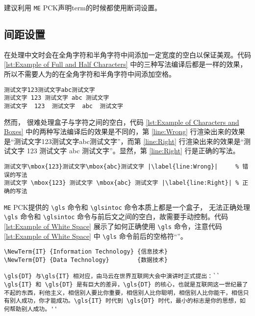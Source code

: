 \documentclass{article}
\begin{document}
建议利用 \texttt{\gls{ME}} \gls{PCK}声明\gls{term}的时候都使用断词设置。

\subsection{间距设置}
\XeLaTeX{} 在处理中文时会在全角字符和半角字符中间添加一定宽度的空白以保证美观。代码 \ref{lst:Example of Full and Half Characters} 中的三种写法编译后都是一样的效果，所以不需要人为的在全角字符和半角字符中间添加空格。

\begin{lstlisting}[style   = latexcode,
                   caption = {全角字符和半角字符混排},
                   label   = {lst:Example of Full and Half Characters}]
测试文字123测试文字abc测试文字
测试文字 123 测试文字 abc 测试文字
测试文字  123  测试文字  abc  测试文字
\end{lstlisting}

然而，\XeLaTeX{} 很难处理盒子与字符之间的空白，代码 \ref{lst:Example of Characters and Boxes} 中的两种写法编译后的效果是不同的，第 \ref{line:Wrong} 行渲染出来的效果是``测试文字\mbox{123}测试文字\mbox{abc}测试文字''，而第 \ref{line:Right} 行渲染出来的效果是``测试文字 \mbox{123} 测试文字 \mbox{abc} 测试文字''。显然，第 \ref{line:Right} 行是正确的写法。
\begin{lstlisting}[style      = latexcode,
                   caption    = {字符与盒子混排},
                   label      = {lst:Example of Characters and Boxes},
                   escapechar = |]
测试文字\mbox{123}测试文字\mbox{abc}测试文字 |\label{line:Wrong}|     % 错误的写法
测试文字 \mbox{123} 测试文字 \mbox{abc} 测试文字 |\label{line:Right}| % 正确的写法
\end{lstlisting}

\texttt{\gls{ME}} \gls{PCK}提供的 \lstinline{\gls} 命令和 \lstinline{\glsintoc} 命令本质上都是一个盒子，\XeLaTeX{} 无法正确处理 \lstinline{\gls} 命令和 \lstinline{\glsintoc} 命令与前后文之间的空白，故需要手动控制。代码 \ref{lst:Example of White Space} 展示了如何正确使用 \lstinline{\gls} 命令，注意代码 \ref{lst:Example of White Space} 中 \lstinline{\gls} 命令前后的空格符``\textvisiblespace''。
\begin{lstlisting}[style      = latexcode,
                   caption    = {正确使用 \texttt{\backslash gls} 命令},
                   label      = {lst:Example of White Space},
                   showspaces = true]
\NewTerm{IT} {Information Technology} {信息技术}
\NewTerm{DT} {Data Technology}        {数据技术}

\gls{DT} 与\gls{IT} 相对应，由马云在世界互联网大会中演讲时正式提出：`` \gls{IT} 和 \gls{DT} 是有巨大的差异，\gls{DT} 的核心，也就是互联网这一世纪最了不起的东西，利他主义，相信别人要比你重要，相信别人比你聪明，相信别人比你能干，相信只有别人成功，你才能成功。\gls{IT} 时代到 \gls{DT} 时代，最小的标志是你的思想，如何帮助别人成功。''
\end{lstlisting}
\end{document}

